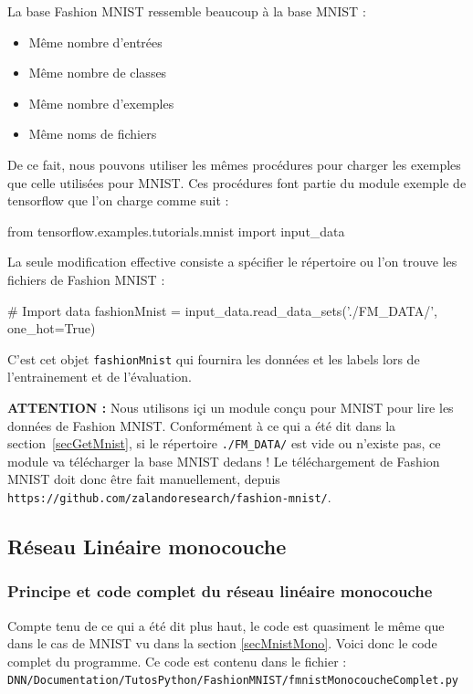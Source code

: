 \documentclass[a4paper,11pt]{book}
\begin{document}
La base Fashion MNIST ressemble beaucoup à la base MNIST :
\begin{itemize}
\item Même nombre d'entrées
\item Même nombre de classes
\item Même nombre d'exemples
\item Même noms de fichiers
\end{itemize}
De ce fait, nous pouvons utiliser les mêmes procédures pour charger les exemples que celle utilisées pour MNIST. Ces procédures font partie du module exemple de tensorflow que l'on charge comme suit :
\begin{mypython}
from tensorflow.examples.tutorials.mnist import input_data
\end{mypython}
La seule modification effective consiste a spécifier le répertoire ou l'on trouve les fichiers de Fashion MNIST :
\begin{mypython}
# Import data
fashionMnist = input_data.read_data_sets('./FM_DATA/', one_hot=True)
\end{mypython}
C'est cet objet \verb+fashionMnist+ qui fournira les données et les labels lors de l'entrainement et de l'évaluation.

\textbf{ATTENTION :} Nous utilisons içi un module conçu pour MNIST pour lire les données de Fashion MNIST. Conformément à ce qui a été dit dans la section~\ref{secGetMnist}, si le répertoire \verb+./FM_DATA/+ est vide ou n'existe pas, ce module va télécharger la base MNIST dedans !
Le téléchargement de Fashion MNIST doit donc être fait manuellement, depuis \verb+https://github.com/zalandoresearch/fashion-mnist/+.

\subsection{Réseau Linéaire monocouche}
\subsubsection{Principe et code complet du réseau linéaire monocouche}
\label{secFashionMnistMono}
Compte tenu de ce qui a été dit plus haut, le code est quasiment le même que dans le cas de MNIST vu dans la section \ref{secMnistMono}. 
Voici donc le code complet du programme. Ce code est contenu dans le fichier :\\
\verb+DNN/Documentation/TutosPython/FashionMNIST/fmnistMonocoucheComplet.py+


\end{document}
